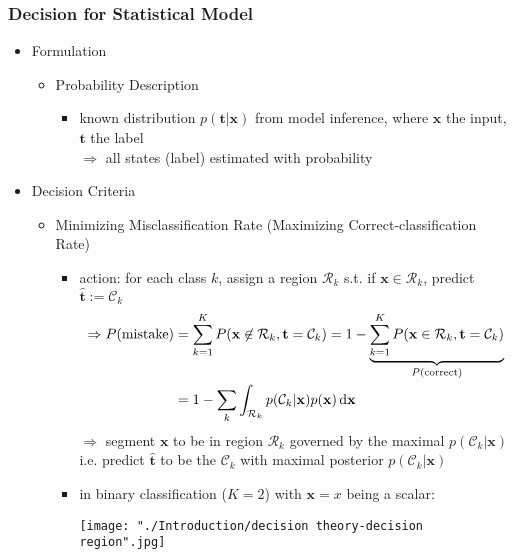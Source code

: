 \subsubsection{Decision for Statistical Model} \label{Intro_Decision_Stat}
\begin{itemize}
\item Formulation
	\begin{itemize}
	\item Probability Description
		\begin{itemize}
		\item known distribution $p(\mathbf t|\mathbf x)$ from model inference, where $\mathbf x$ the input, $\mathbf t$ the label \\
		$\Rightarrow$ all states (label) estimated with probability
		\end{itemize}		
	\end{itemize}
\item Decision Criteria
	\begin{itemize}
	\item Minimizing Misclassification Rate (Maximizing Correct-classification Rate)
		\begin{itemize}
		\item action: for each class $k$, assign a region $\mathcal R_k$ s.t. if $\mathbf x\in \mathcal R_k$, predict $\hat {\mathbf t} := \mathcal C_k$
		\begin{align*}\Rightarrow \displaystyle P(\text{mistake}) &= \sum_{k=1}^K P(\mathbf x\not\in \mathcal R_k, \mathbf t=\mathcal C_k) = 1-\underbrace{\sum_{k=1}^K P(\mathbf x\in\mathcal R_k, \mathbf t=\mathcal C_k)}_{P(\text{correct})} \\ &= 1-\sum_k\int_{\mathcal R_k}p(\mathcal C_k|\mathbf x) p(\mathbf x) \mathop{}\!\mathrm{d}\mathbf x \end{align*}
		$\Rightarrow$ segment $\mathbf x$ to be in region $\mathcal R_k$ governed by the maximal $p(\mathcal C_k | \mathbf x)$ \\
		i.e. predict $\hat {\mathbf t}$ to be the $\mathcal C_k$ with maximal posterior $p(\mathcal C_k | \mathbf x)$
		\item in binary classification ($K=2$) with $\mathbf x = x$ being a scalar: \\
		\begin{minipage}[r]{.5\linewidth}
		\texttt{[image: "./Introduction/decision theory-decision region".jpg]}
		\end{minipage}
		\begin{minipage}[l]{.5\linewidth}

\end{minipage}
\end{itemize}
\end{itemize}
\end{itemize}
